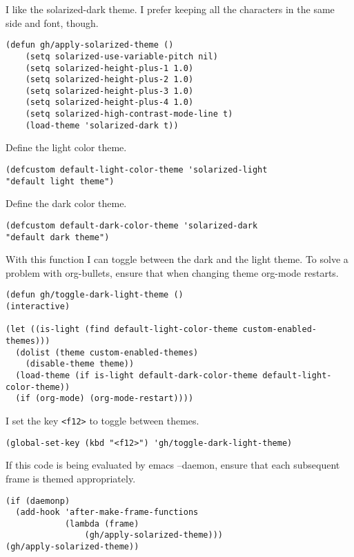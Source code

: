 \documentclass[11pt]{article}
\begin{document}
I like the solarized-dark theme. I prefer keeping all the characters in the same
side and font, though.

\begin{verbatim}
(defun gh/apply-solarized-theme ()
    (setq solarized-use-variable-pitch nil)
    (setq solarized-height-plus-1 1.0)
    (setq solarized-height-plus-2 1.0)
    (setq solarized-height-plus-3 1.0)
    (setq solarized-height-plus-4 1.0)
    (setq solarized-high-contrast-mode-line t)
    (load-theme 'solarized-dark t))
\end{verbatim}

Define the light color theme.

\begin{verbatim}
(defcustom default-light-color-theme 'solarized-light
"default light theme")
\end{verbatim}

Define the dark color theme.

\begin{verbatim}
(defcustom default-dark-color-theme 'solarized-dark
"default dark theme")
\end{verbatim}

With this function I can toggle between the dark and the light theme.
To solve a problem with org-bullets, ensure that when changing theme org-mode restarts.

\begin{verbatim}
(defun gh/toggle-dark-light-theme ()
(interactive)

(let ((is-light (find default-light-color-theme custom-enabled-themes)))
  (dolist (theme custom-enabled-themes)
    (disable-theme theme))
  (load-theme (if is-light default-dark-color-theme default-light-color-theme))
  (if (org-mode) (org-mode-restart))))
\end{verbatim}

I set the key \texttt{<f12>} to toggle between themes.

\begin{verbatim}
(global-set-key (kbd "<f12>") 'gh/toggle-dark-light-theme)
\end{verbatim}

If this code is being evaluated by emacs --daemon, ensure that each subsequent frame is themed appropriately.

\begin{verbatim}
(if (daemonp)
  (add-hook 'after-make-frame-functions
            (lambda (frame)
                (gh/apply-solarized-theme)))
(gh/apply-solarized-theme))
\end{verbatim}
\end{document}
